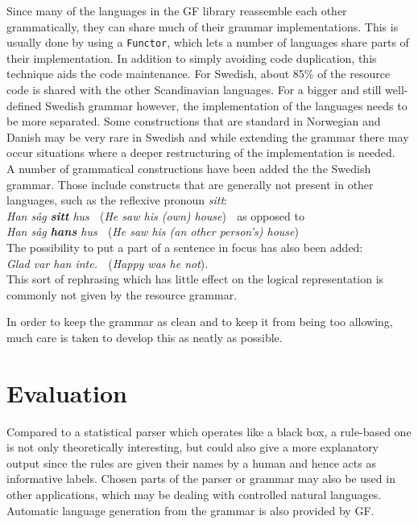 \documentclass[submission]{eptcs} %
\begin{document}
Since many of the languages in the GF library reassemble each other grammatically,
they can share much of their grammar implementations. This is usually done by using a
\verb|Functor|, which lets a number of languages share parts of their implementation. 
In addition to simply avoiding code duplication, this technique aids the code maintenance.
For Swedish, about 85\% of the resource code is shared with the other Scandinavian
languages.
For a bigger and still well-defined Swedish grammar however, the implementation of
the languages needs to be more separated. %
Some constructions that are standard in
Norwegian and Danish may be very rare in Swedish and while extending the
grammar there may occur situations where a deeper restructuring of the
implementation is needed. \\
A number of grammatical constructions have been added the the Swedish grammar.
Those include constructs that are generally not present in other languages,
such as the reflexive pronoun \emph{sitt}: \\
\emph{Han såg \textbf{sitt} hus} $\;$ (\emph{He saw his (own) house}) $\;$
as opposed to \\
\emph{Han såg \textbf{hans} hus} $\;$ (\emph{He saw his (an other person's) house}) \\
The possibility to put a part of a sentence in focus has also been added:\\
\emph{Glad var han inte.} $\;$ (\emph{Happy was he not}). \\
This sort of rephrasing which has little effect on the logical representation
is commonly not given by the resource grammar.

In order to keep the grammar as clean and to keep it from being too allowing,
much care is taken to develop this as neatly as possible. 


\section{Evaluation}
Compared to a statistical parser which operates like a black box,
a rule-based one is not only theoretically interesting,
but could also give a more explanatory output since the rules
are given their names by a human and hence acts as informative labels.
Chosen parts of the parser or grammar may also be used in other applications,
which may be dealing with controlled natural languages. Automatic language
generation from the grammar is also provided by GF.
\end{document}

